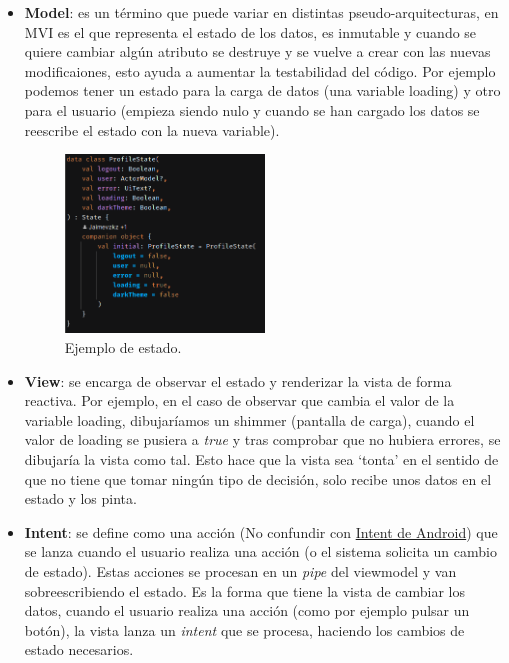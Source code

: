 \begin{itemize}
    \item \textbf{Model}: es un término que puede variar en distintas pseudo-arquitecturas, en MVI es el que representa el estado de los datos, es inmutable y cuando se quiere cambiar algún atributo se destruye y se vuelve a crear con las nuevas modificaiones, esto ayuda a aumentar la testabilidad del código. Por ejemplo podemos tener un estado para la carga de datos (una  variable loading) y otro para el usuario (empieza siendo nulo y cuando se han cargado los datos se reescribe el estado con la nueva variable).
    \begin{figure}[h]
        \centering
        \includegraphics[width = 0.5\textwidth]{Imagenes/Fuentes/ejemplo_estado.png}
        \caption{Ejemplo de estado.}
        \label{fig:ejemplo_estado}
    \end{figure}
    \item \textbf{View}: se encarga de observar el estado y renderizar la vista de forma reactiva. Por ejemplo, en el caso de observar que cambia el valor de la variable loading, dibujaríamos un shimmer (pantalla de carga), cuando el valor de loading se pusiera a \textit{true} y tras comprobar que no hubiera errores, se dibujaría la vista como tal. Esto hace que la vista sea ‘tonta’ en el sentido de que no tiene que tomar ningún tipo de decisión, solo recibe unos datos en el estado y los pinta.
    \item \textbf{Intent}: se define como una acción (No confundir con \href{https://developer.android.com/guide/components/intents-filters}{Intent de Android}) que se lanza cuando el usuario realiza una acción (o el sistema solicita un cambio de estado). Estas acciones se procesan en un \textit{pipe} del viewmodel y van sobreescribiendo el estado. Es la forma que tiene la vista de cambiar los datos, cuando el usuario realiza una acción (como por ejemplo pulsar un botón), la vista lanza un \textit{intent} que se procesa, haciendo los cambios de estado necesarios.

\end{itemize}
